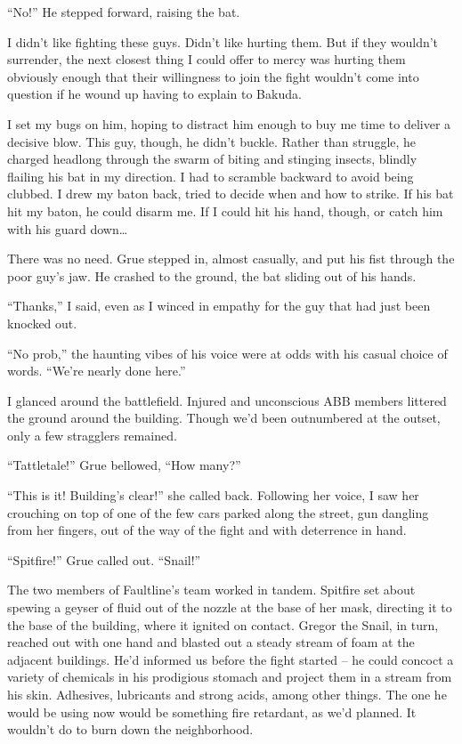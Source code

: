 ``No!''  He stepped forward, raising the bat.



I didn't like fighting these guys.  Didn't like hurting them.  But if they wouldn't surrender, the next closest thing I could offer to mercy was hurting them obviously enough that their willingness to join the fight wouldn't come into question if he wound up having to explain to Bakuda.



I set my bugs on him, hoping to distract him enough to buy me time to deliver a decisive blow.  This guy, though, he didn't buckle.  Rather than struggle, he charged headlong through the swarm of biting and stinging insects, blindly flailing his bat in my direction.  I had to scramble backward to avoid being clubbed.  I drew my baton back, tried to decide when and how to strike.  If his bat hit my baton, he could disarm me.  If I could hit his hand, though, or catch him with his guard down\ldots



There was no need.  Grue stepped in, almost casually, and put his fist through the poor guy's jaw.   He crashed to the ground, the bat sliding out of his hands.



``Thanks,'' I said, even as I winced in empathy for the guy that had just been knocked out.



``No prob,'' the haunting vibes of his voice were at odds with his casual choice of words.  ``We're nearly done here.''



I glanced around the battlefield.  Injured and unconscious ABB members littered the ground around the building.  Though we'd been outnumbered at the outset, only a few stragglers remained.



``Tattletale!'' Grue bellowed, ``How many?''



``This is it!  Building's clear!'' she called back.  Following her voice, I saw her crouching on top of one of the few cars parked along the street, gun dangling from her fingers, out of the way of the fight and with deterrence in hand.



``Spitfire!'' Grue called out.  ``Snail!''



The two members of Faultline's team worked in tandem.  Spitfire set about spewing a geyser of fluid out of the nozzle at the base of her mask, directing it to the base of the building, where it ignited on contact.  Gregor the Snail, in turn, reached out with one hand and blasted out a steady stream of foam at the adjacent buildings.  He'd informed us before the fight started – he could concoct a variety of chemicals in his prodigious stomach and project them in a stream from his skin.  Adhesives, lubricants and strong acids, among other things.  The one he would be using now would be something fire retardant, as we'd planned.  It wouldn't do to burn down the neighborhood.



